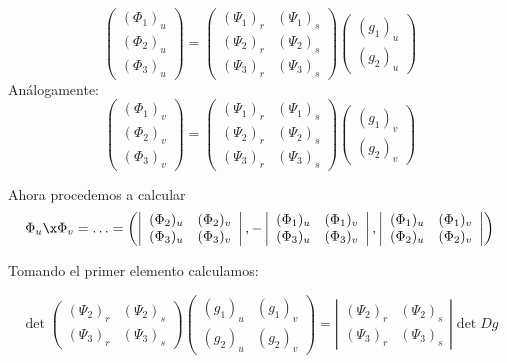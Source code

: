 \[\begin{pmatrix}
(\Phi_1)_u\\(\Phi_2)_u\\(\Phi_3)_u
\end{pmatrix} = \begin{pmatrix}
(\Psi_1)_r & (\Psi_1)_s\\
(\Psi_2)_r & (\Psi_2)_s\\
(\Psi_3)_r & (\Psi_3)_s
\end{pmatrix}\begin{pmatrix}
(g_1)_u\\
(g_2)_u
\end{pmatrix}
\]
Análogamente:
\[\begin{pmatrix}
(\Phi_1)_v\\(\Phi_2)_v\\(\Phi_3)_v
\end{pmatrix} = \begin{pmatrix}
(\Psi_1)_r & (\Psi_1)_s\\
(\Psi_2)_r & (\Psi_2)_s\\
(\Psi_3)_r & (\Psi_3)_s
\end{pmatrix}\begin{pmatrix}
(g_1)_v\\
(g_2)_v
\end{pmatrix}
\]

Ahora procedemos a calcular 
\[\Phi_u\x\Phi_v = \dotsc = \left(
\left|\begin{array}{cc}
(\Phi_2)_u & (\Phi_2)_v\\
(\Phi_3)_u & (\Phi_3)_v
\end{array}
\right|,-
\left|\begin{array}{cc}
(\Phi_1)_u & (\Phi_1)_v\\
(\Phi_3)_u & (\Phi_3)_v
\end{array}
\right|,
\left|\begin{array}{cc}
(\Phi_1)_u & (\Phi_1)_v\\
(\Phi_2)_u & (\Phi_2)_v
\end{array}
\right|
\right)\]

Tomando el primer elemento calculamos:

\[
\det\left(
\begin{array}{cc}
(\Psi_2)_r & (\Psi_2)_s\\
(\Psi_3)_r & (\Psi_3)_s
\end{array}
\right)\begin{pmatrix}
(g_1)_u &(g_1)_v \\
(g_2)_u & (g_2)_v
\end{pmatrix} =
\left| \begin{array}{cc}
(\Psi_2)_r & (\Psi_2)_s\\
(\Psi_3)_r & (\Psi_3)_s
\end{array}\right| \det Dg
\]

